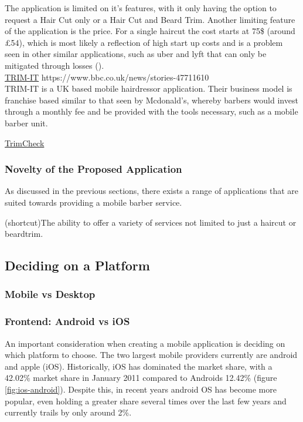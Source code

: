 \documentclass[12pt]{article}
\begin{document}
	The application is limited on it's features, with it only having the option to request a Hair Cut only or a Hair Cut and Beard Trim. 
	Another limiting feature of the application is the price. For a single haircut the cost starts at 75\$ (around £54), which is most likely a reflection of high start up costs and is a problem seen in other similar applications, such as uber and lyft that can only be mitigated through losses (\cite{tech-crunch}).
	\\
	
	\noindent
	\underline{TRIM-IT}
	https://www.bbc.co.uk/news/stories-47711610
	\\
	TRIM-IT is a UK based mobile hairdressor application. Their business model is franchise based similar to that seen by Mcdonald's, whereby barbers would invest through a monthly fee and be provided with the tools necessary, such as a mobile barber unit. 
	
	\noindent
	\underline{TrimCheck}
	
	
	\subsubsection{Novelty of the Proposed Application}
	As discussed in the previous sections, there exists a range of applications that are suited towards providing a mobile barber service.
	
	(shortcut)The ability to offer a variety of services not limited to just a haircut or beardtrim.
	
	\subsection{Deciding on a Platform}
	\subsubsection{Mobile vs Desktop}
	
	\subsubsection{Frontend: Android vs iOS}
	An important consideration when creating a mobile application is deciding on which platform to choose. The two largest mobile providers currently are android and apple (iOS). Historically, iOS has dominated the market share, with a 42.02\% market share in January 2011 compared to Androids 12.42\% (figure \ref{fig:ios-android}). Despite this, in recent years android OS has become more popular, even holding a greater share several times over the last few years and currently trails by only around 2\%.
	
\end{document}
